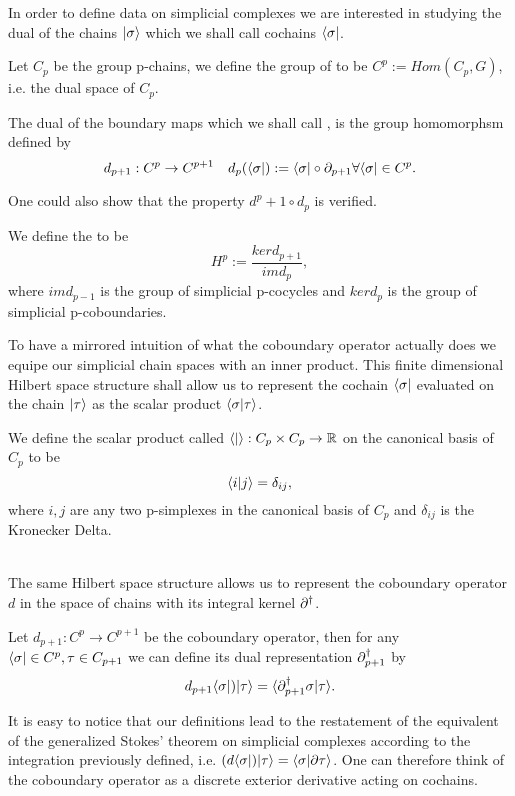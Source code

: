 \documentclass[../1.tex]{subfiles}
\begin{document}
    In order to define data on simplicial complexes we are interested in studying the dual of the chains $| \sigma \rangle$
    which we shall call cochains $\langle \sigma |$.
       
    \begin{defn}
        Let $C_p$ be the group p-chains, we define the group of  to 
        be $C^p := Hom(C_p, G)$, i.e. the dual space of $C_p$.
    \end{defn}

    \begin{defn}
        The dual of the boundary maps which we shall call
        , is the group homomorphsm defined by
        \[ d_{p+1} : C^p \to C^{p+1} \quad d_p(\langle \sigma |) := \langle \sigma | \circ \partial_{p+1} \forall \langle \sigma | \in C^p.\]
    \end{defn}

    One could also show that the property $d^p+1 \circ d_p$ is verified.
    
    \begin{defn}
        We define the  to be 
        \[H^p := \frac{ker d_{p+1}}{im d_{p}},\] 
        where $im d_{p-1}$ is the group of simplicial p-cocycles and
        $ker d_p$ is the group of simplicial p-coboundaries.
    \end{defn}

    To have a mirrored intuition of what the coboundary operator actually does we equipe our simplicial chain spaces with
    an inner product. This finite dimensional Hilbert space structure shall allow us to represent the cochain $\langle \sigma |$ evaluated on the chain $| \tau \rangle$ 
    as the scalar product $\langle \sigma | \tau \rangle$.

    \begin{defn}
        We define the scalar product called  $\langle  |  \rangle : C_p \times C_p \to \mathbb{R}$ on the canonical basis of $C_p$ to be 
        \[ \langle i | j \rangle = \delta_{ij} ,\]  
        where $i,j$ are any two p-simplexes in the canonical basis of $C_p$ and $\delta_{ij}$ is the Kronecker Delta.
    \end{defn}

    \hfill \\
    The same Hilbert space structure allows us to represent the coboundary operator $d$ in the space of chains with its integral kernel $\partial^\dagger$.

    \begin{defn}
        Let $d_{p+1} : C^p \to C^{p+1}$ be the coboundary operator, then for any $\langle \sigma | \in C^p, \tau \in C_{p+1}$ we can define its dual representation $\partial^\dagger_{p+1}$ by
        \[d_{p+1} \langle \sigma |)| \tau \rangle = \langle \partial^\dagger_{p+1} \sigma | \tau \rangle. \]
    \end{defn}

    It is easy to notice that our definitions lead to the restatement of the equivalent of the generalized Stokes' theorem on simplicial complexes
    according to the integration previously defined, i.e. $(d\langle \sigma |)| \tau \rangle = \langle \sigma | \partial\tau \rangle$. One can therefore think of the coboundary
    operator as a discrete exterior derivative acting on cochains.
\end{document}
